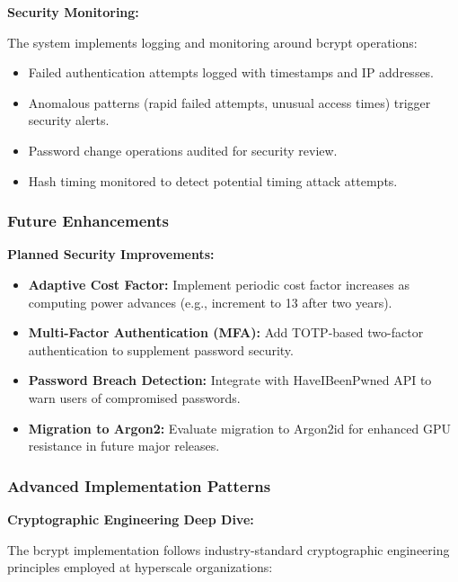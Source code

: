 \documentclass[12pt,a4paper]{article}
\begin{document}
\begin{tcolorbox}[colback=primaryblue!5, colframe=primaryblue, boxrule=1pt, arc=3pt, left=10pt, right=10pt, top=8pt, bottom=8pt]
\vspace{0.5em}

\textbf{Security Monitoring:}

The system implements logging and monitoring around bcrypt operations:

\begin{itemize}[leftmargin=2em, itemsep=6pt]
    \item Failed authentication attempts logged with timestamps and IP addresses.
    \item Anomalous patterns (rapid failed attempts, unusual access times) trigger security alerts.
    \item Password change operations audited for security review.
    \item Hash timing monitored to detect potential timing attack attempts.
\end{itemize}

\subsubsection{Future Enhancements}

\textbf{Planned Security Improvements:}

\begin{itemize}[leftmargin=2em, itemsep=6pt]
    \item \textbf{Adaptive Cost Factor:} Implement periodic cost factor increases as computing power advances (e.g., increment to 13 after two years).
    \item \textbf{Multi-Factor Authentication (MFA):} Add TOTP-based two-factor authentication to supplement password security.
    \item \textbf{Password Breach Detection:} Integrate with HaveIBeenPwned API to warn users of compromised passwords.
    \item \textbf{Migration to Argon2:} Evaluate migration to Argon2id for enhanced GPU resistance in future major releases.
\end{itemize}

\subsubsection{Advanced Implementation Patterns}

\textbf{Cryptographic Engineering Deep Dive:}

The bcrypt implementation follows industry-standard cryptographic engineering principles employed at hyperscale organizations:


\end{tcolorbox}
\end{document}
